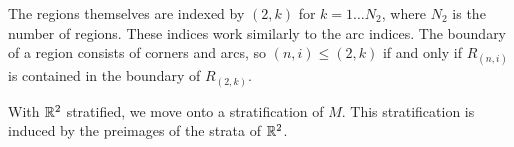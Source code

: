 The regions themselves are indexed by $(2,k)$ for $k=1\dots N_2$, where $N_2$ is the number of regions.
These indices work similarly to the arc indices.
The boundary of a region consists of corners and arcs, so $(n,i)\leq(2,k)$ if and only if $R_{(n,i)}$ is contained in the boundary of $R_{(2,k)}$.

With $\mathbb{R}^2$ stratified, we move onto a stratification of $M$.
This stratification is induced by the preimages of the strata of $\mathbb{R}^2$.

%
%
%
%

